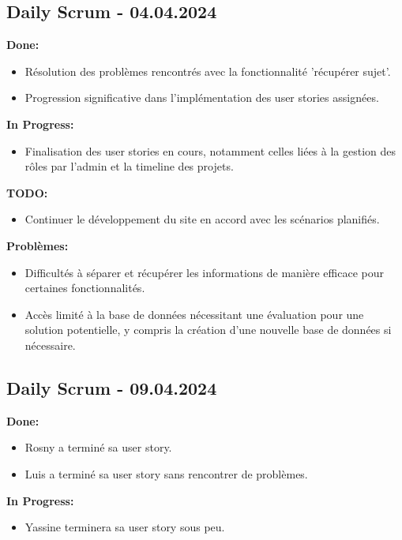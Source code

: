 \documentclass[11pt]{article}
\begin{document}
\subsection*{{\color{navy}Daily Scrum - 04.04.2024}}

\textbf{Done:}
\begin{itemize}
  \item Résolution des problèmes rencontrés avec la fonctionnalité 'récupérer sujet'.
  \item Progression significative dans l'implémentation des user stories assignées.
\end{itemize}

\textbf{In Progress:}
\begin{itemize}
  \item Finalisation des user stories en cours, notamment celles liées à la gestion des rôles par l'admin et la timeline des projets.
\end{itemize}

\textbf{TODO:}
\begin{itemize}
  
  \item Continuer le développement du site en accord avec les scénarios planifiés.
\end{itemize}

\textbf{Problèmes:}
\begin{itemize}
  \item Difficultés à séparer et récupérer les informations de manière efficace pour certaines fonctionnalités.
  \item Accès limité à la base de données nécessitant une évaluation pour une solution potentielle, y compris la création d'une nouvelle base de données si nécessaire.
\end{itemize}






\subsection*{{\color{navy}Daily Scrum - 09.04.2024}}

\textbf{Done:}
\begin{itemize}
  \item Rosny a terminé sa user story.
  \item Luis a terminé sa user story sans rencontrer de problèmes.
\end{itemize}

\textbf{In Progress:}
\begin{itemize}
  \item Yassine terminera sa user story sous peu.
\end{itemize}
\end{document}
